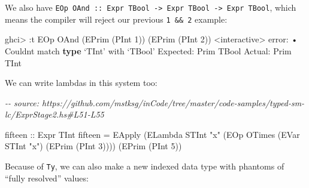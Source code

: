 \documentclass[]{article}
\newenvironment{Shaded}{}{}
\newcommand{\CommentTok}[1]{\textcolor[rgb]{0.38,0.63,0.69}{\textit{#1}}}
\newcommand{\DataTypeTok}[1]{\textcolor[rgb]{0.56,0.13,0.00}{#1}}
\newcommand{\DecValTok}[1]{\textcolor[rgb]{0.25,0.63,0.44}{#1}}
\newcommand{\FunctionTok}[1]{\textcolor[rgb]{0.02,0.16,0.49}{#1}}
\newcommand{\KeywordTok}[1]{\textcolor[rgb]{0.00,0.44,0.13}{\textbf{#1}}}
\newcommand{\NormalTok}[1]{#1}
\newcommand{\OperatorTok}[1]{\textcolor[rgb]{0.40,0.40,0.40}{#1}}
\newcommand{\OtherTok}[1]{\textcolor[rgb]{0.00,0.44,0.13}{#1}}
\newcommand{\StringTok}[1]{\textcolor[rgb]{0.25,0.44,0.63}{#1}}
\begin{document}
We also have
\texttt{EOp\ OAnd\ ::\ Expr\ TBool\ -\textgreater{}\ Expr\ TBool\ -\textgreater{}\ Expr\ TBool},
which means the compiler will reject our previous \texttt{1\ \&\&\ 2} example:

\begin{Shaded}
\begin{Highlighting}[]
\NormalTok{ghci}\OperatorTok{\textgreater{}} \OperatorTok{:}\NormalTok{t }\DataTypeTok{EOp} \DataTypeTok{OAnd}\NormalTok{ (}\DataTypeTok{EPrim}\NormalTok{ (}\DataTypeTok{PInt} \DecValTok{1}\NormalTok{)) (}\DataTypeTok{EPrim}\NormalTok{ (}\DataTypeTok{PInt} \DecValTok{2}\NormalTok{))}
\OperatorTok{\textless{}}\NormalTok{interactive}\OperatorTok{\textgreater{}} \FunctionTok{error}\OperatorTok{:}
\NormalTok{    • }\DataTypeTok{Couldn\textquotesingle{}t}\NormalTok{ match }\KeywordTok{type}\NormalTok{ ‘}\DataTypeTok{TInt}\NormalTok{’ with ‘}\DataTypeTok{TBool}\NormalTok{’}
      \DataTypeTok{Expected}\OperatorTok{:} \DataTypeTok{Prim} \DataTypeTok{TBool}
        \DataTypeTok{Actual}\OperatorTok{:} \DataTypeTok{Prim} \DataTypeTok{TInt}
\end{Highlighting}
\end{Shaded}

We can write lambdas in this system too:

\begin{Shaded}
\begin{Highlighting}[]
\CommentTok{{-}{-} source: https://github.com/mstksg/inCode/tree/master/code{-}samples/typed{-}sm{-}lc/ExprStage2.hs\#L51{-}L55}

\OtherTok{fifteen ::} \DataTypeTok{Expr} \DataTypeTok{TInt}
\NormalTok{fifteen }\OtherTok{=}
  \DataTypeTok{EApply}
\NormalTok{    (}\DataTypeTok{ELambda} \DataTypeTok{STInt} \StringTok{"x"}\NormalTok{ (}\DataTypeTok{EOp} \DataTypeTok{OTimes}\NormalTok{ (}\DataTypeTok{EVar} \DataTypeTok{STInt} \StringTok{"x"}\NormalTok{) (}\DataTypeTok{EPrim}\NormalTok{ (}\DataTypeTok{PInt} \DecValTok{3}\NormalTok{))))}
\NormalTok{    (}\DataTypeTok{EPrim}\NormalTok{ (}\DataTypeTok{PInt} \DecValTok{5}\NormalTok{))}
\end{Highlighting}
\end{Shaded}

Because of \texttt{Ty}, we can also make a new indexed data type with phantoms
of ``fully resolved'' values:
\end{document}
